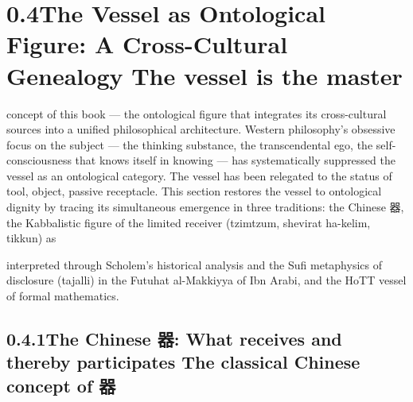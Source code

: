 \section{0.4\quad The Vessel as Ontological Figure: A Cross-Cultural Genealogy The vessel is the master}

concept of this book — the ontological figure that integrates its cross-cultural sources into a unified philosophical architecture. Western philosophy’s obsessive focus on the subject — the thinking substance, the transcendental ego, the self-consciousness that knows itself in knowing — has systematically suppressed the vessel as an ontological category. The vessel has been relegated to the status of tool, object, passive receptacle. This section restores the vessel to ontological dignity by tracing its simultaneous emergence in three traditions: the Chinese 器, the Kabbalistic figure of the limited receiver (tzimtzum, shevirat ha-kelim, tikkun) as

interpreted through Scholem’s historical analysis and the Sufi metaphysics of disclosure (tajalli) in the Futuhat al-Makkiyya of Ibn Arabi, and the HoTT vessel of formal mathematics.

\subsection{0.4.1\quad The Chinese 器: What receives and thereby participates The classical Chinese concept of 器}


